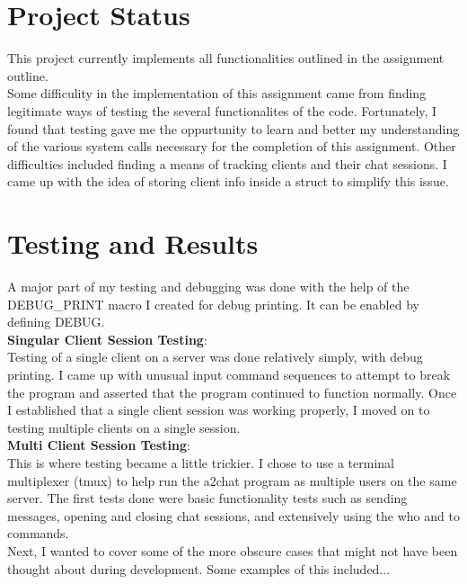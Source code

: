 \documentclass{article}
\begin{document}
\section{Project Status}
This project currently implements all functionalities outlined in the
assignment outline. \\

\noindent
Some difficulity in the implementation of this
assignment came from finding legitimate ways of testing the several
functionalites of the code. Fortunately, I found that testing gave me the
oppurtunity to learn and better my understanding of the various system calls
necessary for the completion of this assignment.
Other difficulties included finding a means of tracking clients
and their chat sessions. I came up with the idea of storing client
info inside a struct to simplify this issue.


\section{Testing and Results}

A major part of my testing and debugging was done with
the help of the DEBUG\_PRINT macro I created for
debug printing. It can be enabled by defining DEBUG. \\

\noindent
\textbf{Singular Client Session Testing}: \\
Testing of a single client on a server was done
relatively simply, with debug printing. I came up
with unusual input command sequences to attempt to
break the program and asserted that the program
continued to function normally.
Once I established that a single client session was
working properly, I moved on to testing multiple clients
on a single session. \\

\noindent
\textbf{Multi Client Session Testing}: \\
This is where testing became a little trickier.
I chose to use a terminal multiplexer (tmux) to help
run the a2chat program as multiple users on the same
server. The first tests done were basic functionality
tests such as sending messages, opening and closing
chat sessions, and extensively using the who and
to commands.\\

\noindent
Next, I wanted to cover some of the more obscure cases
that might not have been thought about during
development. Some examples of this included...
\end{document}
